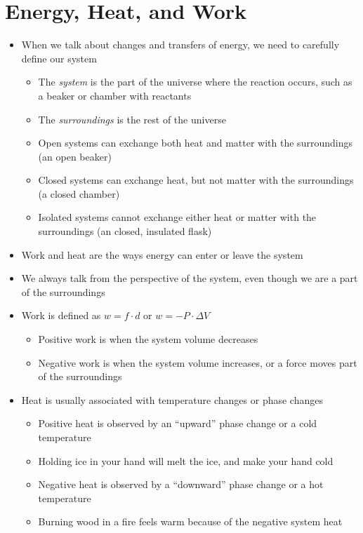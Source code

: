 \documentclass[12pt, openany, letterpaper]{memoir}
\begin{document}
\section{Energy, Heat, and Work}
\begin{itemize}
	\item When we talk about changes and transfers of energy, we need to carefully define our system
	      \begin{itemize}
		      \item The \emph{system} is the part of the universe where the reaction occurs, such as a beaker or chamber with reactants
		      \item The \emph{surroundings} is the rest of the universe
		      \item Open systems can exchange both heat and matter with the surroundings (an open beaker)
		      \item Closed systems can exchange heat, but not matter with the surroundings (a closed chamber)
		      \item Isolated systems cannot exchange either heat or matter with the surroundings (an closed, insulated flask)
	      \end{itemize}
	\item Work and heat are the ways energy can enter or leave the system
	\item We always talk from the perspective of the system, even though we are a part of the surroundings
	\item Work is defined as $w=f\cdot d$ or $w=-P\cdot\Delta V$
	      \begin{itemize}
		      \item Positive work is when the system volume decreases
		      \item Negative work is when the system volume increases, or a force moves part of the surroundings
	      \end{itemize}
	\item Heat is usually associated with temperature changes or phase changes
	      \begin{itemize}
		      \item Positive heat is observed by an “upward” phase change or a cold temperature
		      \item Holding ice in your hand will melt the ice, and make your hand cold
		      \item Negative heat is observed by a “downward” phase change or a hot temperature
		      \item Burning wood in a fire feels warm because of the negative system heat

\end{itemize}
\end{itemize}
\end{document}
